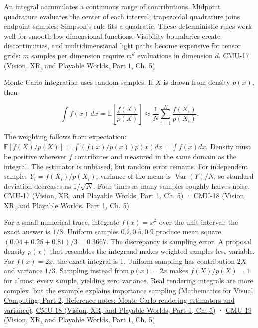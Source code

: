 An integral accumulates a continuous range of contributions. Midpoint quadrature evaluates the center of each interval; trapezoidal quadrature joins endpoint samples; Simpson's rule fits a quadratic. These deterministic rules work well for smooth low-dimensional functions. Visibility boundaries create discontinuities, and multidimensional light paths become expensive for tensor grids: \(m\) samples per dimension require \(m^d\) evaluations in dimension \(d\). \href{../07-Vision-XR-and-Playable-Worlds-P01/main.pdf\#nameddest=04-visual-computing-ii-ch036-cmu-17---numerical-integration}{CMU-17 (Vision, XR, and Playable Worlds, Part 1, Ch. 5)}

Monte Carlo integration uses random samples. If \(X\) is drawn from density \(p(x)\), then

\[
\int f(x)\,dx=\mathbb E\left[\frac{f(X)}{p(X)}\right]\approx\frac1N\sum_{i=1}^N\frac{f(X_i)}{p(X_i)}.
\]

The weighting follows from expectation: \(\mathbb E[f(X)/p(X)]=\int (f(x)/p(x))p(x)dx=\int f(x)dx\). Density must be positive wherever \(f\) contributes and measured in the same domain as the integral. The estimator is unbiased, but random error remains. For independent samples \(Y_i=f(X_i)/p(X_i)\), variance of the mean is \(\operatorname{Var}(Y)/N\), so standard deviation decreases as \(1/\sqrt N\). Four times as many samples roughly halves noise. \href{../07-Vision-XR-and-Playable-Worlds-P01/main.pdf\#nameddest=04-visual-computing-ii-ch036-cmu-17---numerical-integration}{CMU-17 (Vision, XR, and Playable Worlds, Part 1, Ch. 5)} · \href{../07-Vision-XR-and-Playable-Worlds-P01/main.pdf\#nameddest=04-visual-computing-ii-ch036-cmu-18---monte-carlo-rendering}{CMU-18 (Vision, XR, and Playable Worlds, Part 1, Ch. 5)}

For a small numerical trace, integrate \(f(x)=x^2\) over the unit interval; the exact answer is \(1/3\). Uniform samples \(0.2,0.5,0.9\) produce mean square \((0.04+0.25+0.81)/3=0.3667\). The discrepancy is sampling error. A proposal density \(p(x)\) that resembles the integrand makes weighted samples less variable. For \(f(x)=2x\), the exact integral is 1. Uniform sampling has contribution \(2X\) and variance \(1/3\). Sampling instead from \(p(x)=2x\) makes \(f(X)/p(X)=1\) for almost every sample, yielding zero variance. Real rendering integrals are more complex, but the example explains \href{../02-Mathematics-for-Visual-Computing-P02/main.pdf\#nameddest=appendix-031e02bf28af}{importance sampling (Mathematics for Visual Computing, Part 2, Reference notes: Monte Carlo rendering estimators and variance)}. \href{../07-Vision-XR-and-Playable-Worlds-P01/main.pdf\#nameddest=04-visual-computing-ii-ch036-cmu-18---monte-carlo-rendering}{CMU-18 (Vision, XR, and Playable Worlds, Part 1, Ch. 5)} · \href{../07-Vision-XR-and-Playable-Worlds-P01/main.pdf\#nameddest=04-visual-computing-ii-ch036-cmu-19---variance-reduction}{CMU-19 (Vision, XR, and Playable Worlds, Part 1, Ch. 5)}

